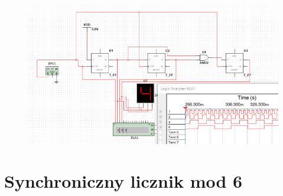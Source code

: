 \documentclass[12pt,a4paper]{article}
\begin{document}
\begin{figure}[H]
\centering
\includegraphics{img/4c}
\end{figure}



\section{Synchroniczny licznik mod 6}
\end{document}
